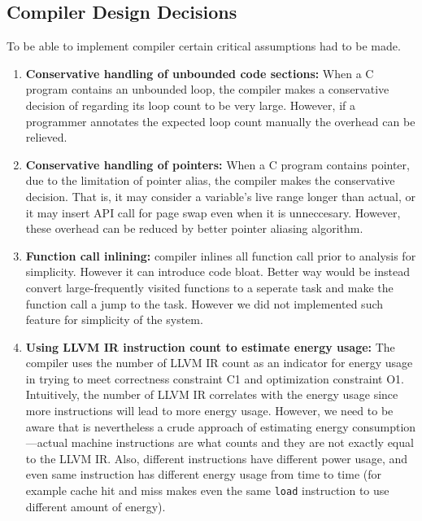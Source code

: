 \subsection{Compiler Design Decisions}
\label{sec:compiler_limitations}

To be able to implement \sys compiler certain critical assumptions had to be made. 

\begin{enumerate}
	\item \textbf{Conservative handling of unbounded code sections:} When a C program contains an unbounded loop, the \sys compiler makes a conservative decision of regarding its loop count to be very large. However, if a programmer annotates the expected loop count manually the overhead can be relieved.
	\item \textbf{Conservative handling of pointers:} When a C program contains pointer, due to the limitation of pointer alias, the compiler makes the conservative decision. That is, it may consider a variable's live range longer than actual, or it may insert API call for page swap even when it is unneccesary. However, these overhead can be reduced by better pointer aliasing algorithm.
	\item \textbf{Function call inlining:} \sys compiler inlines all function call prior to analysis for simplicity. However it can introduce code bloat. Better way would be instead convert large-frequently visited functions to a seperate task and make the function call a jump to the task. However we did not implemented such feature for simplicity of the system.
	\item \textbf{Using LLVM IR instruction count to estimate energy usage:} The compiler uses the number of LLVM IR count as an indicator for energy usage in trying to meet correctness constraint C1 and optimization constraint O1. Intuitively, the number of LLVM IR correlates with the energy usage since more instructions will lead to more energy usage. However, we need to be aware that is nevertheless a crude approach of estimating energy consumption---actual machine instructions are what counts and they are not exactly equal to the LLVM IR. Also, different instructions have different power usage, and even same instruction has different energy usage from time to time (for example cache hit and miss makes even the same {\tt load} instruction to use different amount of energy). 


\end{enumerate}
